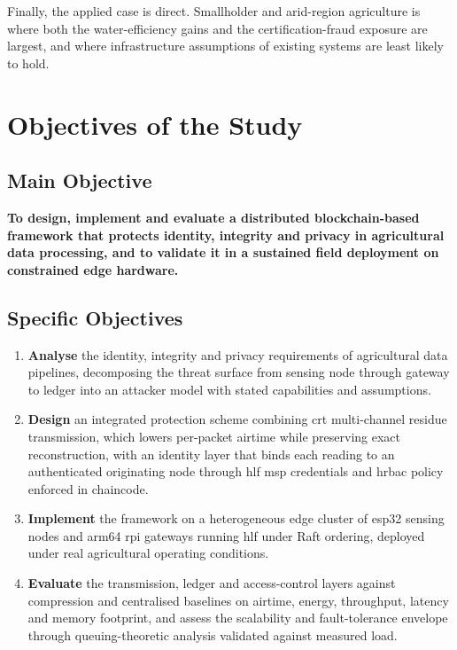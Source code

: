 \documentclass[12pt,a4paper,oneside]{book}
\begin{document}
Finally, the applied case is direct. Smallholder and arid-region agriculture is
where both the water-efficiency gains and the certification-fraud exposure are
largest, and where infrastructure assumptions of existing systems are least
likely to hold.

\section{Objectives of the Study}
\label{sec:objectives}

\subsection{Main Objective}
\label{subsec:main_objective}

\textbf{To design, implement and evaluate a distributed blockchain-based
framework that protects identity, integrity and privacy in agricultural data
processing, and to validate it in a sustained field deployment on constrained
edge hardware.}

\subsection{Specific Objectives}
\label{subsec:specific_objectives}

\begin{enumerate}
  \item \textbf{Analyse} the identity, integrity and privacy requirements of
        agricultural data pipelines, decomposing the threat surface from
        sensing node through gateway to ledger into an attacker model with
        stated capabilities and assumptions.

  \item \textbf{Design} an integrated protection scheme combining \gls{crt}
        multi-channel residue transmission, which lowers per-packet airtime
        while preserving exact reconstruction, with an identity layer that
        binds each reading to an authenticated originating node through
        \gls{hlf} \gls{msp} credentials and \gls{hrbac} policy enforced in
        chaincode.

  \item \textbf{Implement} the framework on a heterogeneous edge cluster of
        \gls{esp32} sensing nodes and \gls{arm64} \gls{rpi} gateways running
        \gls{hlf} under Raft ordering, deployed under real agricultural
        operating conditions.

  \item \textbf{Evaluate} the transmission, ledger and access-control layers
        against compression and centralised baselines on airtime, energy,
        throughput, latency and memory footprint, and assess the scalability
        and fault-tolerance envelope through queuing-theoretic analysis
        validated against measured load.
\end{enumerate}
\end{document}
